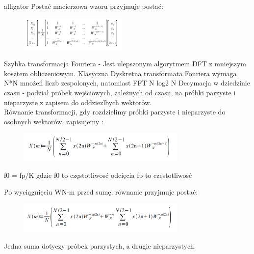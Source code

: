 \documentclass[12pt]{article}
\begin{document}
\begin{labeling}{alligator}
Postać macierzowa wzoru przyjmuje postać:
\begin{figure}[h!]
 \centering
 \includegraphics[width=5.3cm]{PMAcierzowa.PNG}
 \vspace{-0.3cm}
 \label{Splot_indeks}
\end{figure}

\item [Szybka transformacja Fouriera]  - Jest ulepszonym algorytmem DFT z mniejszym kosztem obliczeniowym. Klasyczna Dyskretna transformata Fouriera wymaga N*N mnożeń liczb zespolonych, natomiast FFT N log2 N
\subitem Decymacja w dziedzinie czasu - podział próbek wejściowych, zależnych od czasu, na próbki parzyste i nieparzyste z zapisem do oddziezlbych wektorów.
\\Równanie transformacji, gdy rozdzielimy próbki parzyste i nieparzyste do osobnych wektorów, zapisujemy :

\begin{figure}[h!]
 \centering
 \includegraphics[width=8.3cm]{Decy.PNG}
 \vspace{-0.3cm}
 \label{filtrS}
\end{figure}
\subsubitem f0 = fp/K gdzie f0 to częstotliwosć odcięcia
\subsubitem fp to częstotliwosć 

Po wyciągnięciu WN-m przed sumę, równanie przyjmuje postać:

\begin{figure}[h!]
 \centering
 \includegraphics[width=8.3cm]{DecyW.PNG}
 \vspace{-0.3cm}
 \label{filtrS}
\end{figure}

Jedna suma dotyczy próbek parzystych, a drugie nieparzystych.


\end{labeling}
\end{document}
